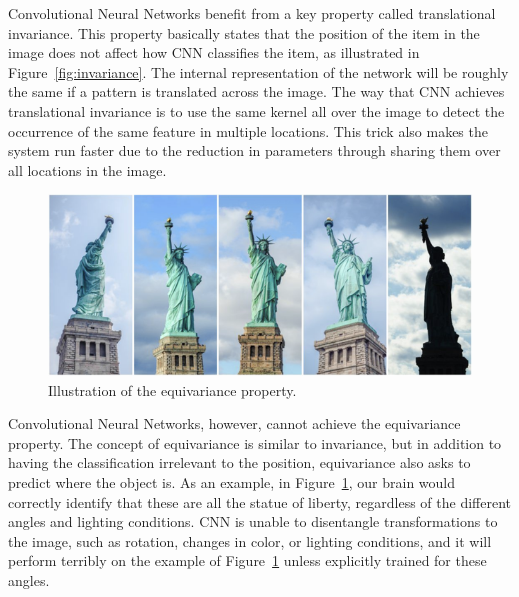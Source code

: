 \documentclass{article}
\begin{document}

Convolutional Neural Networks benefit from a key property called translational invariance. This property basically states that the position of the item in the image does not affect how CNN classifies the item, as illustrated in Figure~\ref{fig:invariance}. The internal representation of the network will be roughly the same if a pattern is translated across the image. The way that CNN achieves translational invariance is to use the same kernel all over the image to detect the occurrence of the same feature in multiple locations. This trick also makes the system run faster due to the reduction in parameters through sharing them over all locations in the image.

\begin{figure}[!htb]
	\centering\includegraphics[width=\textwidth]{fig/equivariance}
	\caption{Illustration of the equivariance property.\protect\footnotemark }\label{fig:equivariance}
\end{figure}


Convolutional Neural Networks, however, cannot achieve the equivariance property. The concept of equivariance is similar to invariance, but in addition to having the classification irrelevant to the position, equivariance also asks to predict where the object is. As an example, in Figure~\ref{fig:equivariance}, our brain would correctly identify that these are all the statue of liberty, regardless of the different angles and lighting conditions. CNN is unable to disentangle transformations to the image, such as rotation, changes in color, or lighting conditions, and it will perform terribly on the example of Figure~\ref{fig:equivariance} unless explicitly trained for these angles.
\end{document}
